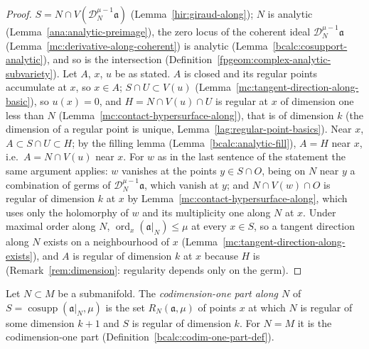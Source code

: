 \begin{proof}
\leanok
\(S=N\cap V(\mathcal D_N^{\mu-1}\mathfrak a)\) (Lemma~\ref{hir:giraud-along}); \(N\) is analytic (Lemma~\ref{ana:analytic-preimage}), the zero locus of the coherent ideal
\(\mathcal D_N^{\mu-1}\mathfrak a\) (Lemma~\ref{mc:derivative-along-coherent}) is analytic (Lemma~\ref{bcalc:cosupport-analytic}), and so is the intersection
(Definition~\ref{fpgeom:complex-analytic-subvariety}). Let \(A\), \(x\), \(u\) be as stated. \(A\) is closed and its regular points accumulate at \(x\), so \(x\in A\);
\(S\cap U\subset V(u)\) (Lemma~\ref{mc:tangent-direction-along-basic}), so \(u(x)=0\), and \(H=N\cap V(u)\cap U\) is regular at \(x\) of dimension one less than \(N\)
(Lemma~\ref{mc:contact-hypersurface-along}), that is of dimension \(k\) (the dimension of a regular point is unique, Lemma~\ref{lag:regular-point-basics}).
Near \(x\), \(A\subset S\cap U\subset H\); by the filling lemma (Lemma~\ref{bcalc:analytic-fill}), \(A=H\) near \(x\), i.e.\ \(A=N\cap V(u)\) near \(x\). For \(w\) as in the last sentence of the statement the same
argument applies: \(w\) vanishes at the points \(y\in S\cap O\), being on \(N\) near \(y\) a combination of germs of \(\mathcal D_N^{\mu-1}\mathfrak a\), which vanish at \(y\);
and \(N\cap V(w)\cap O\) is regular of dimension \(k\) at \(x\) by Lemma~\ref{mc:contact-hypersurface-along}, which uses only the holomorphy of \(w\) and its
multiplicity one along \(N\) at \(x\). Under maximal order
along \(N\), \(\operatorname{ord}_x(\mathfrak a|_N)\le\mu\) at every \(x\in S\), so a tangent direction along \(N\) exists on a neighbourhood of \(x\)
(Lemma~\ref{mc:tangent-direction-along-exists}), and \(A\) is regular of dimension \(k\) at \(x\) because \(H\) is (Remark~\ref{rem:dimension}: regularity depends only
on the germ).
\end{proof}

\begin{definition}
\label{bcalc:codim-one-part-along-def}
\leanok
Let \(N\subset M\) be a submanifold. The \emph{codimension-one part along \(N\)} of \(S=\operatorname{cosupp}(\mathfrak a|_N,\mu)\) is the set \(R_N(\mathfrak a,\mu)\) of points
\(x\) at which \(N\) is regular of some dimension \(k+1\) and \(S\) is regular of dimension \(k\). For \(N=M\) it is the codimension-one part
(Definition~\ref{bcalc:codim-one-part-def}).
\end{definition}

